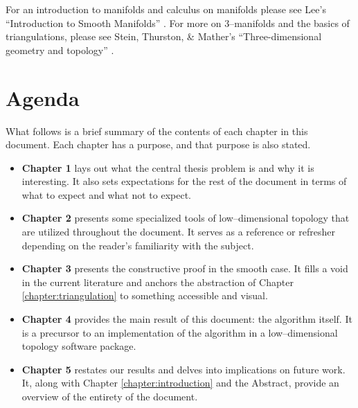 For an introduction to manifolds and calculus on manifolds please see Lee's ``Introduction to Smooth Manifolds'' \cite{Lee00}.
For more on 3--manifolds and the basics of triangulations, please see Stein, Thurston, \& Mather's ``Three-dimensional geometry and topology'' \cite{stein1997three}.

\section{Agenda}

What follows is a brief summary of the contents of each chapter in this document.
Each chapter has a purpose, and that purpose is also stated.

{\renewcommand\labelitemi{}
	\begin{itemize}
		\item \textbf{Chapter 1} lays out what the central thesis problem is and why it is interesting.  It also sets expectations for the rest of the document in terms of what to expect and what not to expect.
		\item \textbf{Chapter 2} presents some specialized tools of low--dimensional topology that are utilized throughout the document.  It serves as a reference or refresher depending on the reader's familiarity with the subject.
		\item \textbf{Chapter 3} presents the constructive proof in the smooth case.  It fills a void in the current literature and anchors the abstraction of Chapter \ref{chapter:triangulation} to something accessible and visual.
		\item \textbf{Chapter 4} provides the main result of this document: the algorithm itself.  It is a precursor to an implementation of the algorithm in a low--dimensional topology software package.
		\item \textbf{Chapter 5} restates our results and delves into implications on future work.  It, along with Chapter \ref{chapter:introduction} and the Abstract, provide an overview of the entirety of the document.
	\end{itemize}
}